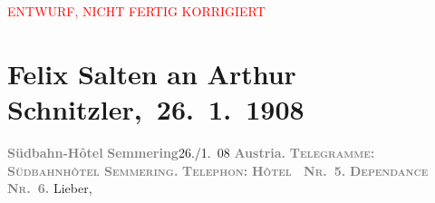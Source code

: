 
\begin{center}
            \textcolor{red}{ENTWURF, NICHT FERTIG KORRIGIERT}
                      \end{center}
            
         
         \renewcommand{\erwaehntePersonen}{Personen: Samuel Fischer, Hedwig Fischer, Margarethe Kainz, Josef Kainz, Anna Katharina Rehmann, Ottilie Salten, Paul Salten, Paula Schlenther, Paul Schlenther, Olga Schnitzler, Heinrich Schnitzler,  W. Fred}
         \renewcommand{\erwaehnteInstitutionen}{Institutionen: Franz-Grillparzer-Preis}
         \renewcommand{\erwaehnteOrte}{Orte: Semmering, Südbahnhotel, Wien, Österreich}
         \renewcommand{\erwaehnteWerke}{Werke: Der Weg ins Freie. Roman, Die neue Rundschau, Tagebuch}
               \section[ Felix Salten an Arthur Schnitzler, 26. 1. 1908]{ Felix Salten an Arthur Schnitzler, 26. 1. 1908}\nopagebreak{}\rehead{ }\begin{ledgroupsized}[t]{13cm}\normalsize\beginnumbering \toendnotes[C]{\smallbreak\pagebreak[2]} 
\toendnotes[C]{\smallbreak}\pstart
           \noindent{}{\pb}\textcolor{gray}{\textbf{Südbahn-Hôtel}}\pend
           \pstart
           \textcolor{gray}{\textbf{Semmering}}\hfill 26./1. 08\pend
           \pstart
           \textcolor{gray}{\textbf{Austria.}}\pend
           \pstart
           \textcolor{gray}{\textbf{\textsc{\textbf{Telegramme:}}}}\pend
           \pstart
           \textcolor{gray}{\textbf{\textsc{\textbf{Südbahnhôtel Semmering.}}}}\pend
           \pstart
           \textcolor{gray}{\textbf{\textsc{Telephon:}}}\pend
           \pstart
           \textcolor{gray}{\textbf{\textsc{Hôtel {\dotsfour} Nr. 5.}}}\pend
           \pstart
           \textcolor{gray}{\textbf{\textsc{Dependance Nr. 6.}}}\pend
           \pstart{}Lieber,\pend\pstart

\end{ledgroupsized}
